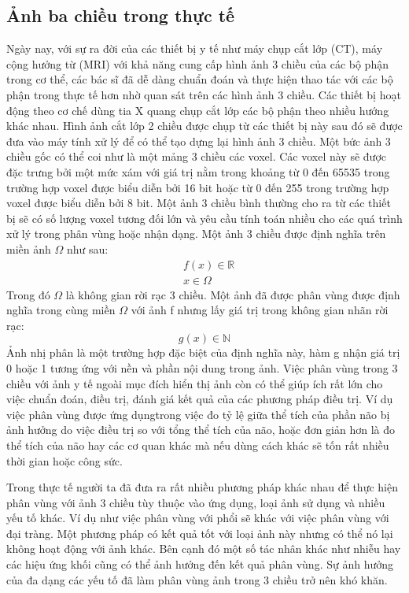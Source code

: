 \documentclass[12pt, oneside, a4paper]{book}
\begin{document}
\subsection{Ảnh ba chiều trong thực tế}
Ngày nay, với sự ra đời của các thiết bị y tế  như máy chụp cắt lớp (CT), máy cộng hưởng từ (MRI) với khả năng cung cấp hình ảnh 3 chiều của các bộ phận trong cơ thể, các bác sĩ đã dễ dàng chuẩn đoán và thực hiện thao tác với các bộ phận trong thực tế hơn nhờ quan sát trên các hình ảnh  3 chiều. Các thiết bị hoạt động theo cơ chế dùng tia X quang chụp cắt lớp các bộ phận theo nhiều hướng khác nhau. Hình ảnh cắt lớp 2 chiều được chụp từ các thiết bị này sau đó sẽ được đưa vào máy tính xử lý để có thể tạo dựng lại hình ảnh 3 chiều. Một bức ảnh 3 chiều gốc có thể coi như là một mảng 3 chiều các voxel. Các voxel này sẽ được đặc trưng bởi một mức xám với giá trị nằm trong khoảng từ 0 đến 65535 trong trường hợp voxel được biểu diễn bởi 16 bit hoặc từ 0 đến 255 trong trường hợp voxel được biểu diễn bởi 8 bit. Một ảnh 3 chiều bình thường cho ra từ các thiết bị sẽ có số lượng voxel tương đối lớn và yêu cầu tính toán nhiều cho các quá trình xử lý trong phân vùng hoặc nhận dạng. 
Một ảnh 3 chiều được định nghĩa trên miền ảnh $\Omega$ như sau: 
\begin{equation}
\begin{split}
&f(x)\in \mathbb{R}\\
&x\in \Omega
\end{split}
\end{equation} 
Trong đó $\Omega$ là không gian rời rạc 3 chiều. Một ảnh đã được phân vùng được định nghĩa trong cùng miền $\Omega$ với ảnh f nhưng lấy giá trị trong không gian nhãn rời rạc: 
\begin{equation}
g(x)\in \mathbb{N}
\end{equation}
Ảnh nhị phân là một trường hợp đặc biệt của định nghĩa này, hàm g nhận giá trị 0 hoặc 1 tương ứng với nền và phần nội dung trong ảnh. 
Việc  phân vùng trong 3 chiều với ảnh y tế ngoài mục đích hiển thị ảnh còn có thể giúp ích rất lớn cho việc chuẩn đoán, điều trị, đánh giá kết quả của các phương pháp điều trị. Ví dụ việc phân vùng được ứng dụngtrong việc đo tỷ lệ giữa thể tích của phần não bị ảnh hưởng do việc điều trị so với tổng thể tích của não, hoặc đơn giản hơn là đo thể tích của não hay các cơ quan khác mà nếu dùng cách khác sẽ tốn rất nhiều thời gian hoặc công sức.

Trong thực tế người ta đã đưa ra rất nhiều phương pháp khác nhau để thực hiện phân vùng với ảnh 3 chiều tùy thuộc vào ứng dụng, loại ảnh sử dụng và nhiều yếu tố khác. Ví dụ như việc phân vùng với phổi sẽ khác với việc phân vùng với đại tràng. Một phương pháp có kết quả tốt với loại ảnh này nhưng có thể nó lại không hoạt động với ảnh khác. Bên cạnh đó một số tác nhân khác như nhiễu hay các hiệu ứng khối cũng có thể ảnh hưởng đến kết quả phân vùng. Sự ảnh hưởng của đa dạng các yếu tố đã làm phân vùng ảnh trong 3 chiều trở nên khó khăn.
\end{document}
